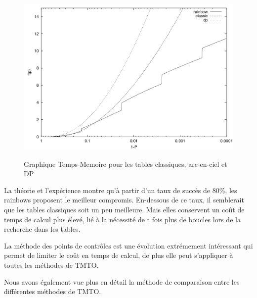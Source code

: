 \begin{figure}[h!]
	\includegraphics[scale=0.25]{other/graph_gamma_P.png}
	\caption{}{Graphique Temps-Memoire pour les tables classiques, arc-en-ciel et DP}
	\label{fig:TMTO_carac}
\end{figure}

	La théorie et l'expérience montre qu'à partir d'un taux de succès de 80\%, les \glspl{rainbow} proposent le meilleur compromis. En-dessous de ce taux, il semblerait que les tables classiques soit un peu meilleure. Mais elles conservent un coût de temps de calcul plus élevé, lié à la nécessité de t fois plus de boucles lors de la recherche dans les tables.

	La méthode des points de contrôles est une évolution extrémement intéressant qui permet de limiter le coût en temps de calcul, de plus elle peut s'appliquer à toutes les méthodes de \gls{TMTO}.

	\bigskip

	Nous avons également vue plus en détail la méthode de comparaison entre les différentes méthodes de \gls{TMTO}.

\endinput{}
